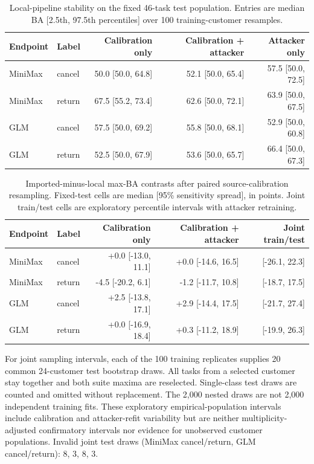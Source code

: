 \begin{table}[ht]\centering\small
\caption{Local-pipeline stability on the fixed 46-task test population. Entries are median BA [2.5th, 97.5th percentiles] over 100 training-customer resamples.}\label{tab:r21-local}
\begin{tabular}{llrrr}\toprule
Endpoint & Label & Calibration only & Calibration + attacker & Attacker only\\\midrule
MiniMax & cancel & 50.0 [50.0, 64.8] & 52.1 [50.0, 65.4] & 57.5 [50.0, 72.5] \\
MiniMax & return & 67.5 [55.2, 73.4] & 62.6 [50.0, 72.1] & 63.9 [50.0, 67.5] \\
GLM & cancel & 57.5 [50.0, 69.2] & 55.8 [50.0, 68.1] & 52.9 [50.0, 60.8] \\
GLM & return & 52.5 [50.0, 67.9] & 53.6 [50.0, 65.7] & 66.4 [50.0, 67.3] \\
\bottomrule\end{tabular}\end{table}

\begin{table}[ht]\centering\small
\caption{Imported-minus-local max-BA contrasts after paired source-calibration resampling. Fixed-test cells are median [95\% sensitivity spread], in points. Joint train/test cells are exploratory percentile intervals with attacker retraining.}\label{tab:r21-deltas}
\begin{tabular}{llrrr}\toprule
Endpoint & Label & Calibration only & Calibration + attacker & Joint train/test\\\midrule
MiniMax & cancel & +0.0 [-13.0, 11.1] & +0.0 [-14.6, 16.5] & [-26.1, 22.3] \\
MiniMax & return & -4.5 [-20.2, 6.1] & -1.2 [-11.7, 10.8] & [-18.7, 17.5] \\
GLM & cancel & +2.5 [-13.8, 17.1] & +2.9 [-14.4, 17.5] & [-21.7, 27.4] \\
GLM & return & +0.0 [-16.9, 18.4] & +0.3 [-11.2, 18.9] & [-19.9, 26.3] \\
\bottomrule\end{tabular}\end{table}
For joint sampling intervals, each of the 100 training replicates supplies 20 common 24-customer test bootstrap draws. All tasks from a selected customer stay together and both suite maxima are reselected. Single-class test draws are counted and omitted without replacement. The 2,000 nested draws are not 2,000 independent training fits. These exploratory empirical-population intervals include calibration and attacker-refit variability but are neither multiplicity-adjusted confirmatory intervals nor evidence for unobserved customer populations.
Invalid joint test draws (MiniMax cancel/return, GLM cancel/return): 8, 3, 8, 3.

